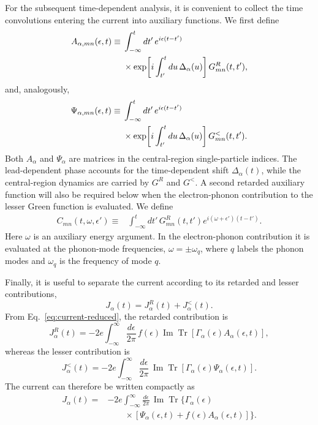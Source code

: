 \documentclass[
 reprint,
 superscriptaddress,
 amsmath,amssymb,
 aps,prb,
 longbibliography,
 floatfix
]{revtex4-2}
\begin{document}
For the subsequent time-dependent analysis, it is convenient to collect the time convolutions entering the current into auxiliary functions. We first define
\begin{align}
A_{\alpha,mn}(\epsilon,t)
\equiv{}&
\int_{-\infty}^{t}dt'\,
e^{i\epsilon(t-t')}
\notag\\
&\times
\exp\!\left[
i\int_{t'}^{t}du\,\Delta_\alpha(u)
\right]
G_{mn}^{R}(t,t'),
\label{eq:Aalpha-definition}
\end{align}
and, analogously,
\begin{align}
\Psi_{\alpha,mn}(\epsilon,t)
\equiv{}&
\int_{-\infty}^{t}dt'\,
e^{i\epsilon(t-t')}
\notag\\
&\times
\exp\!\left[
i\int_{t'}^{t}du\,\Delta_\alpha(u)
\right]
G_{mn}^{<}(t,t').
\label{eq:Psi-definition}
\end{align}
Both \(A_\alpha\) and \(\Psi_\alpha\) are matrices in the central-region single-particle indices. The lead-dependent phase accounts for the time-dependent shift \(\Delta_\alpha(t)\), while the central-region dynamics are carried by \(G^R\) and \(G^<\). A second retarded auxiliary function will also be required below when the electron-phonon contribution to the lesser Green function is evaluated. We define
\begin{align}
C_{mn}(t,\omega,\epsilon')
\equiv{}&
\int_{-\infty}^{t}dt'\,
G_{mn}^{R}(t,t')
e^{i(\omega+\epsilon')(t-t')}.
\end{align}
Here \(\omega\) is an auxiliary energy argument. In the electron-phonon contribution it is evaluated at the phonon-mode frequencies, $\omega=\pm\omega_q$, where \(q\) labels the phonon modes and \(\omega_q\) is the frequency of mode \(q\). 

Finally, it is useful to separate the current according to its retarded and lesser contributions,
\begin{equation*}
J_\alpha(t)
=
J_\alpha^{R}(t)
+
J_\alpha^{<}(t).
\end{equation*}
From Eq.~\eqref{eq:current-reduced}, the retarded contribution is
\begin{equation*}
J_\alpha^{R}(t)
=
-2e
\int_{-\infty}^{\infty}
\frac{d\epsilon}{2\pi}\,
f(\epsilon)
\operatorname{Im}
\operatorname{Tr}
\left[
\Gamma_\alpha(\epsilon)
A_\alpha(\epsilon,t)
\right],
\end{equation*}
whereas the lesser contribution is
\begin{equation*}
J_\alpha^{<}(t)
=
-2e
\int_{-\infty}^{\infty}
\frac{d\epsilon}{2\pi}\,
\operatorname{Im}
\operatorname{Tr}
\left[
\Gamma_\alpha(\epsilon)
\Psi_\alpha(\epsilon,t)
\right].
\end{equation*}
The current can therefore be written compactly as
\begin{equation}
\boxed{
\begin{aligned}
J_\alpha(t)
={}&
-2e
\int_{-\infty}^{\infty}
\frac{d\epsilon}{2\pi}\,
\operatorname{Im}
\operatorname{Tr}
\Big\{
\Gamma_\alpha(\epsilon)
\\
&\qquad\times
\left[
\Psi_\alpha(\epsilon,t)
+
f(\epsilon)A_\alpha(\epsilon,t)
\right]
\Big\}.
\end{aligned}}
\label{eq:Jalpha-A-Psi}
\end{equation}
\end{document}
